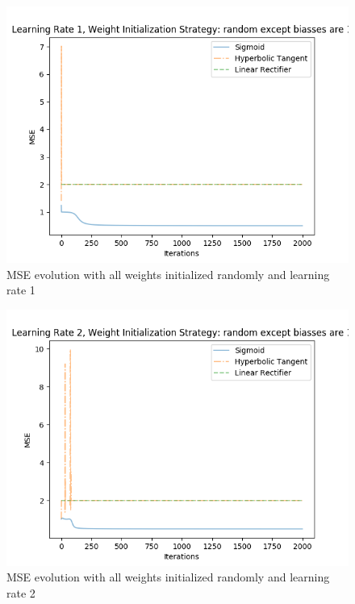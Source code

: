 \documentclass{article}
\begin{document}
\begin{figure}[H]
\centering
\includegraphics[width=0.9\linewidth]{img/mse_randomexceptbiassesare1_1.png}
\caption{MSE evolution with all weights initialized randomly and learning rate 1}
\label{fig:mser1}
\end{figure}
\begin{figure}[H]
\centering
\includegraphics[width=0.9\linewidth]{img/mse_randomexceptbiassesare1_2.png}
\caption{MSE evolution with all weights initialized randomly and learning rate 2}
\label{fig:mser2}
\end{figure}
\end{document}
